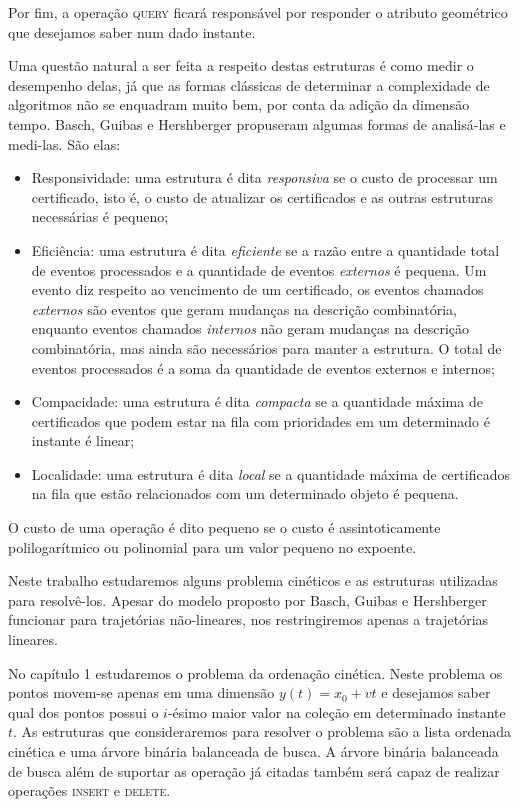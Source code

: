 Por fim, a operação \textsc{query} ficará responsável por responder o atributo
geométrico que desejamos saber num dado instante.

Uma questão natural a ser feita a respeito destas estruturas é como medir o
desempenho delas, já que as formas clássicas de determinar a complexidade de
algoritmos não se enquadram muito bem, por conta da adição da dimensão tempo. %
Basch, Guibas e Hershberger propuseram algumas formas de analisá-las e medi-las.
São elas:
\begin{itemize}
    \item Responsividade: uma estrutura é dita \textit{responsiva} se o custo de
    processar um certificado, isto é, o custo de atualizar os certificados e as
    outras estruturas necessárias é pequeno;
    \item Eficiência: uma estrutura é dita \textit{eficiente} se a razão entre a
    quantidade total de eventos processados e a quantidade de eventos
    \textit{externos} é pequena. Um evento diz respeito ao vencimento de um
    certificado, os eventos chamados \textit{externos} são eventos que geram
    mudanças na descrição combinatória, enquanto eventos chamados
    \textit{internos} não geram mudanças na descrição combinatória, mas ainda
    são necessários para manter a estrutura. O total de eventos processados é a
    soma da quantidade de eventos externos e internos;
    \item Compacidade: uma estrutura é dita \textit{compacta} se a quantidade máxima de
    certificados que podem estar na fila com prioridades em um determinado é
    instante é linear;
    \item Localidade: uma estrutura é dita \textit{local} se a quantidade máxima
    de certificados na fila que estão relacionados com um determinado objeto é
    pequena.
\end{itemize}

O custo de uma operação é dito pequeno se o custo é assintoticamente
polilogarítmico ou polinomial para um valor pequeno no expoente.

Neste trabalho estudaremos alguns problema cinéticos e as estruturas utilizadas
para resolvê-los. Apesar do modelo proposto por Basch, Guibas e Hershberger
funcionar para trajetórias não-lineares, nos restringiremos apenas a trajetórias
lineares.

No capítulo 1 estudaremos o problema da ordenação cinética. Neste problema os
pontos movem-se apenas em uma dimensão $y(t) = x_0 + vt$ e desejamos saber qual
dos pontos possui o $i$-ésimo maior valor na coleção em determinado instante
$t$. As estruturas que consideraremos para resolver o problema são a lista
ordenada cinética e uma árvore binária balanceada de busca. A árvore binária
balanceada de busca além de suportar as operação já citadas também será capaz de
realizar operações \textsc{insert} e \textsc{delete}.


